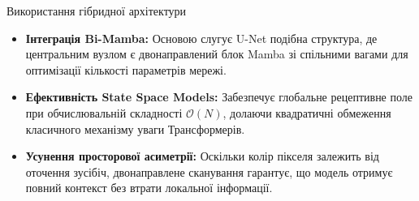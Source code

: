 \documentclass[10pt, aspectratio=169, xcolor=table]{beamer}
\begin{document}
    \begin{frame}{Використання гібридної архітектури}
        \begin{itemize}
            \item<alert@1> \textbf{Інтеграція Bi-Mamba:} Основою слугує U-Net подібна структура, де центральним вузлом є двонаправлений блок Mamba зі спільними вагами для оптимізації кількості параметрів мережі.
            \item \textbf{Ефективність State Space Models:} Забезпечує глобальне рецептивне поле при обчислювальній складності $\mathcal{O}(N)$, долаючи квадратичні обмеження класичного механізму уваги Трансформерів.
            \item \textbf{Усунення просторової асиметрії:} Оскільки колір пікселя залежить від оточення зусібіч, двонаправлене сканування гарантує, що модель отримує повний контекст без втрати локальної інформації.
        \end{itemize}
    \end{frame}
\end{document}
